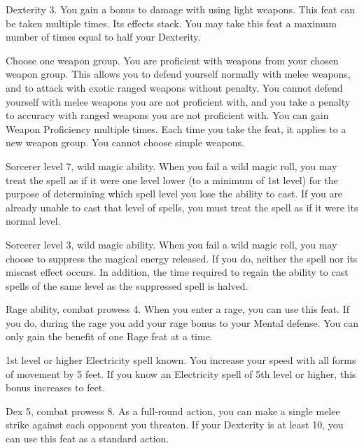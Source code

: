 \featpre Dexterity 3.
\featben You gain a  bonus to damage with  using light weapons.
 This feat can be taken multiple times. Its effects stack.
You may take this feat a maximum number of times equal to half your Dexterity.

Choose one weapon group.
\featben You are proficient with weapons from your chosen weapon group.
This allows you to defend yourself normally with melee weapons, and to attack with exotic ranged weapons without penalty.
You cannot defend yourself with melee weapons you are not proficient with, and you take a  penalty to accuracy with ranged weapons you are not proficient with.
You can gain Weapon Proficiency multiple times.
Each time you take the feat, it applies to a new weapon group.
You cannot choose simple weapons.

\featpres Sorcerer level 7, wild magic ability.
\featben When you fail a wild magic roll, you may treat the spell as if it were one level lower (to a minimum of 1st level) for the purpose of determining which spell level you lose the ability to cast.
If you are already unable to cast that level of spells, you must treat the spell as if it were its normal level.

\featpres Sorcerer level 3, wild magic ability.
\featben When you fail a wild magic roll, you may choose to suppress the magical energy released.
If you do, neither the spell nor its miscast effect occurs.
In addition, the time required to regain the ability to cast spells of the same level as the suppressed spell is halved.

\featpres Rage ability, combat prowess 4.
\featben When you enter a rage, you can use this feat. If you do, during the rage you add your rage bonus to your Mental defense.
 You can only gain the benefit of one Rage feat at a time.

\featpre 1st level or higher Electricity spell known.
\featben You increase your speed with all forms of movement by 5 feet.
If you know an Electricity spell of 5th level or higher, this bonus increases to  feet.

\featpres Dex 5, combat prowess 8.
\featben As a full-round action, you can make a single melee strike against each opponent you threaten.
If your Dexterity is at least 10, you can use this feat as a standard action.

